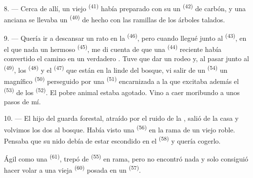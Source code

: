 8. --- Cerca de allí, un viejo  \textsuperscript{(41)} había
preparado con su  un  \textsuperscript{(42)} de carbón, y
una anciana se llevaba un  \textsuperscript{(40)} de 
hecho con las ramillas de los árboles talados.

\VUsaut{3.0mm}
\VUsaut{3.0mm}

9. --- Quería ir a descansar un rato en la 
\textsuperscript{(46)}, pero cuando llegué junto al  \textsuperscript{(43)},
en el que nada un hermoso  \textsuperscript{(45)}, me di cuenta de que
una  \textsuperscript{(44)} reciente había convertido el camino en
un verdadero . Tuve que dar un rodeo y, al pasar junto al
 \textsuperscript{(49)}, los  \textsuperscript{(48)} y el
 \textsuperscript{(47)} que están en la linde del bosque, vi salir de un
 \textsuperscript{(54)} un magnífico  \textsuperscript{(50)}
perseguido por una  \textsuperscript{(51)} encarnizada a la que
excitaba además el  \textsuperscript{(53)} de los  \textsuperscript{(52)}. El pobre animal estaba agotado. Vino a caer
moribundo a unos pasos de mí.

10. --- El hijo del guarda forestal, atraído por el ruido de la
, salió de la casa y volvimos los dos al bosque. Había
visto una  \textsuperscript{(56)} en la rama de un viejo roble.
Pensaba que su nido debía de estar escondido en el 
\textsuperscript{(58)} y quería cogerlo.

Ágil como una  \textsuperscript{(61)}, trepó de 
\textsuperscript{(55)} en rama, pero no encontró nada y solo consiguió hacer volar
a una vieja  \textsuperscript{(60)} posada en un 
\textsuperscript{(57)}.
\VUsaut{4.0mm}
\VUfilet{22mm}
